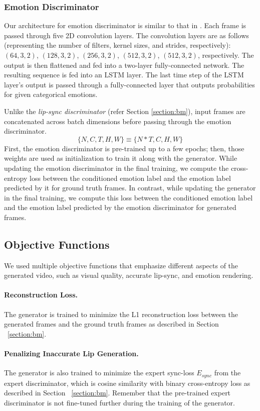 \documentclass[accepted]{uai2023}
\begin{document}
\subsubsection{Emotion Discriminator}
Our architecture for emotion discriminator is similar to that in \citep{9496264}. Each frame is passed through five 2D convolution layers. The convolution layers are as follows (representing the number of filters, kernel sizes, and strides, respectively): $(64, 3, 2)$, $(128, 3, 2)$, $(256, 3, 2)$, $(512, 3, 2)$, $(512, 3, 2)$, respectively. The output is then flattened and fed into a two-layer fully-connected network. The resulting sequence is fed into an LSTM \citep{hochreiter1997long} layer. The last time step of the LSTM layer's output is passed through a fully-connected layer that outputs probabilities for given categorical emotions.


Unlike the \emph{lip-sync discriminator} (refer Section \ref{section:bm}), input frames are concatenated across batch dimensions before passing through the emotion discriminator.
\[ \{N,C,T,H,W\}  \equiv \{N*T,C,H,W\} \]
First, the emotion discriminator is pre-trained up to a few epochs; then, those weights are used as initialization to train it along with the generator. While updating the emotion discriminator in the final training, we compute the cross-entropy loss between the conditioned emotion label and the emotion label predicted by it for ground truth frames. In contrast, while updating the generator in the final training, we compute this loss between the conditioned emotion label and the emotion label predicted by the emotion discriminator for generated frames.

\subsection{Objective Functions}
We used multiple objective functions that emphasize different aspects of the generated video, such as visual quality, accurate lip-sync, and emotion rendering. 

\paragraph{Reconstruction Loss.}
The generator is trained to minimize the L1 reconstruction loss between the generated frames and the ground truth frames as described in Section ~\ref{section:bm}.

\paragraph{Penalizing Inaccurate Lip Generation.}
The generator is also trained to minimize the expert sync-loss $E_{sync}$ from the expert discriminator, which is cosine similarity with binary cross-entropy loss as described in Section ~\ref{section:bm}.
Remember that the pre-trained expert discriminator is not fine-tuned further during the training of the generator.
\end{document}
